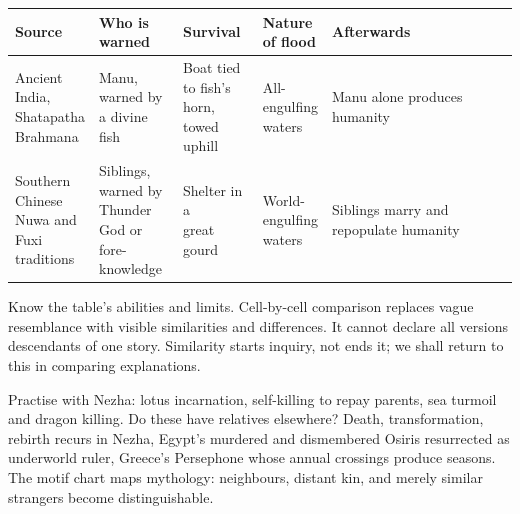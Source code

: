 \noindent
\begin{tabularx}{\linewidth}{llllX}
\toprule
Source & \shortstack[l]{Who is\\ warned} & Survival & \shortstack[l]{Nature\\ of flood} & Afterwards \\
\midrule
\shortstack[l]{Ancient\\ India,\\ Shatapatha\\ Brahmana} & \shortstack[l]{Manu,\\ warned by\\ a divine\\ fish} & \shortstack[l]{Boat tied\\ to fish's\\ horn, towed\\ uphill} & \shortstack[l]{All-\\ engulfing\\ waters} & Manu alone produces humanity \\
\shortstack[l]{Southern\\ Chinese\\ Nuwa and\\ Fuxi\\ traditions} & \shortstack[l]{Siblings,\\ warned by\\ Thunder\\ God or fore-\\ knowledge} & \shortstack[l]{Shelter in a\\ great gourd} & \shortstack[l]{World-\\ engulfing\\ waters} & Siblings marry and repopulate humanity \\
\bottomrule
\end{tabularx}

\smallskip
Know the table's abilities and limits. Cell-by-cell comparison replaces vague resemblance with visible similarities and differences. It cannot declare all versions descendants of one story. Similarity starts inquiry, not ends it; we shall return to this in comparing explanations.

Practise with Nezha: lotus incarnation, self-killing to repay parents, sea turmoil and dragon killing. Do these have relatives elsewhere? Death, transformation, rebirth recurs in Nezha, Egypt's murdered and dismembered Osiris resurrected as underworld ruler, Greece's Persephone whose annual crossings produce seasons. The motif chart maps mythology: neighbours, distant kin, and merely similar strangers become distinguishable.

